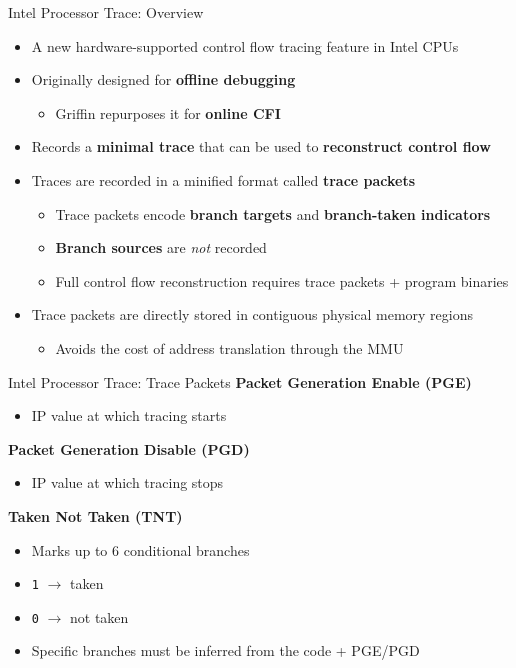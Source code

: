 \documentclass[12pt, dvipsnames, aspectratio=169]{beamer}
\begin{document}
\begin{frame}[c]{Intel Processor Trace: Overview}{}
  \begin{itemize}
    \item A new hardware-supported control flow tracing feature in Intel CPUs

    \vfill
    \item Originally designed for \textbf{offline debugging}
    \begin{itemize}
      \item Griffin repurposes it for \textbf{online CFI}
    \end{itemize}

    \vfill
    \item Records a \textbf{minimal trace} that can be used to \textbf{reconstruct control flow}

    \vfill
    \item Traces are recorded in a minified format called \textbf{trace packets}
    \begin{itemize}
      \item Trace packets encode \textbf{branch targets} and \textbf{branch-taken indicators}
      \item \textbf{Branch sources} are \textit{not} recorded
      \item Full control flow reconstruction requires trace packets + program binaries
    \end{itemize}

    \vfill
    \item Trace packets are directly stored in contiguous physical memory regions
    \begin{itemize}
      \item Avoids the cost of address translation through the MMU
    \end{itemize}
  \end{itemize}
\end{frame}

\begin{frame}[c]{Intel Processor Trace: Trace Packets}{}
{\bf Packet Generation Enable (PGE)}
\begin{itemize}
  \item IP value at which tracing starts
\end{itemize}

\vfill
{\bf Packet Generation Disable (PGD)}
\begin{itemize}
  \item IP value at which tracing stops
\end{itemize}

\vfill
{\bf Taken Not Taken (TNT)}
\begin{itemize}
  \item Marks up to 6 conditional branches
  \item \texttt{1} $\rightarrow$ taken
  \item \texttt{0} $\rightarrow$ not taken
  \item Specific branches must be inferred from the code + PGE/PGD
\end{itemize}
\end{frame}
\end{document}
